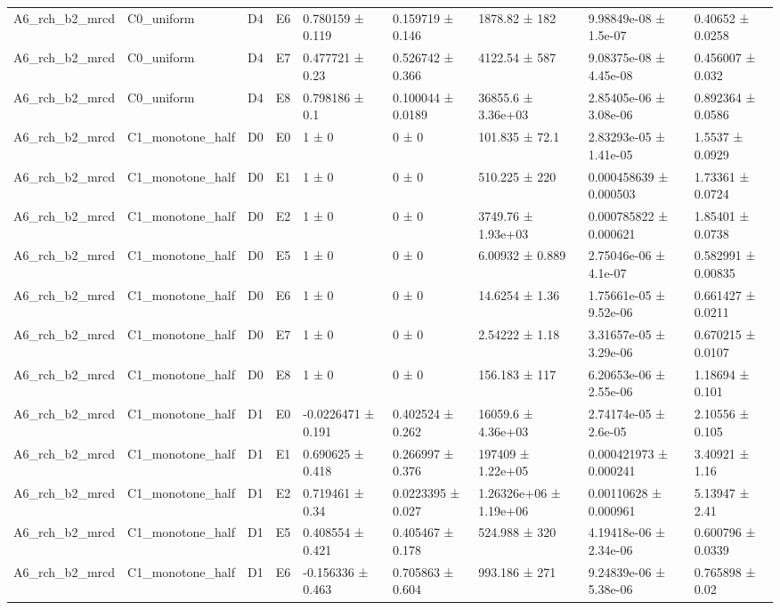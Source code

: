 \begin{table}
\begin{tabular}{lllllllll}
A6\_rch\_b2\_mrcd & C0\_uniform & D4 & E6 & 0.780159 ± 0.119 & 0.159719 ± 0.146 & 1878.82 ± 182 & 9.98849e-08 ± 1.5e-07 & 0.40652 ± 0.0258 \\
A6\_rch\_b2\_mrcd & C0\_uniform & D4 & E7 & 0.477721 ± 0.23 & 0.526742 ± 0.366 & 4122.54 ± 587 & 9.08375e-08 ± 4.45e-08 & 0.456007 ± 0.032 \\
A6\_rch\_b2\_mrcd & C0\_uniform & D4 & E8 & 0.798186 ± 0.1 & 0.100044 ± 0.0189 & 36855.6 ± 3.36e+03 & 2.85405e-06 ± 3.08e-06 & 0.892364 ± 0.0586 \\
A6\_rch\_b2\_mrcd & C1\_monotone\_half & D0 & E0 & 1 ± 0 & 0 ± 0 & 101.835 ± 72.1 & 2.83293e-05 ± 1.41e-05 & 1.5537 ± 0.0929 \\
A6\_rch\_b2\_mrcd & C1\_monotone\_half & D0 & E1 & 1 ± 0 & 0 ± 0 & 510.225 ± 220 & 0.000458639 ± 0.000503 & 1.73361 ± 0.0724 \\
A6\_rch\_b2\_mrcd & C1\_monotone\_half & D0 & E2 & 1 ± 0 & 0 ± 0 & 3749.76 ± 1.93e+03 & 0.000785822 ± 0.000621 & 1.85401 ± 0.0738 \\
A6\_rch\_b2\_mrcd & C1\_monotone\_half & D0 & E5 & 1 ± 0 & 0 ± 0 & 6.00932 ± 0.889 & 2.75046e-06 ± 4.1e-07 & 0.582991 ± 0.00835 \\
A6\_rch\_b2\_mrcd & C1\_monotone\_half & D0 & E6 & 1 ± 0 & 0 ± 0 & 14.6254 ± 1.36 & 1.75661e-05 ± 9.52e-06 & 0.661427 ± 0.0211 \\
A6\_rch\_b2\_mrcd & C1\_monotone\_half & D0 & E7 & 1 ± 0 & 0 ± 0 & 2.54222 ± 1.18 & 3.31657e-05 ± 3.29e-06 & 0.670215 ± 0.0107 \\
A6\_rch\_b2\_mrcd & C1\_monotone\_half & D0 & E8 & 1 ± 0 & 0 ± 0 & 156.183 ± 117 & 6.20653e-06 ± 2.55e-06 & 1.18694 ± 0.101 \\
A6\_rch\_b2\_mrcd & C1\_monotone\_half & D1 & E0 & -0.0226471 ± 0.191 & 0.402524 ± 0.262 & 16059.6 ± 4.36e+03 & 2.74174e-05 ± 2.6e-05 & 2.10556 ± 0.105 \\
A6\_rch\_b2\_mrcd & C1\_monotone\_half & D1 & E1 & 0.690625 ± 0.418 & 0.266997 ± 0.376 & 197409 ± 1.22e+05 & 0.000421973 ± 0.000241 & 3.40921 ± 1.16 \\
A6\_rch\_b2\_mrcd & C1\_monotone\_half & D1 & E2 & 0.719461 ± 0.34 & 0.0223395 ± 0.027 & 1.26326e+06 ± 1.19e+06 & 0.00110628 ± 0.000961 & 5.13947 ± 2.41 \\
A6\_rch\_b2\_mrcd & C1\_monotone\_half & D1 & E5 & 0.408554 ± 0.421 & 0.405467 ± 0.178 & 524.988 ± 320 & 4.19418e-06 ± 2.34e-06 & 0.600796 ± 0.0339 \\
A6\_rch\_b2\_mrcd & C1\_monotone\_half & D1 & E6 & -0.156336 ± 0.463 & 0.705863 ± 0.604 & 993.186 ± 271 & 9.24839e-06 ± 5.38e-06 & 0.765898 ± 0.02 \\

\end{tabular}
\end{table}
